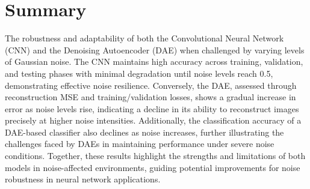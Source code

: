 \section{Summary}
The robustness and adaptability of both the Convolutional Neural Network (CNN) and the Denoising Autoencoder (DAE) when challenged by varying levels of Gaussian noise. The CNN maintains high accuracy across training, validation, and testing phases with minimal degradation until noise levels reach 0.5, demonstrating effective noise resilience. Conversely, the DAE, assessed through reconstruction MSE and training/validation losses, shows a gradual increase in error as noise levels rise, indicating a decline in its ability to reconstruct images precisely at higher noise intensities. Additionally, the classification accuracy of a DAE-based classifier also declines as noise increases, further illustrating the challenges faced by DAEs in maintaining performance under severe noise conditions. Together, these results highlight the strengths and limitations of both models in noise-affected environments, guiding potential improvements for noise robustness in neural network applications.



